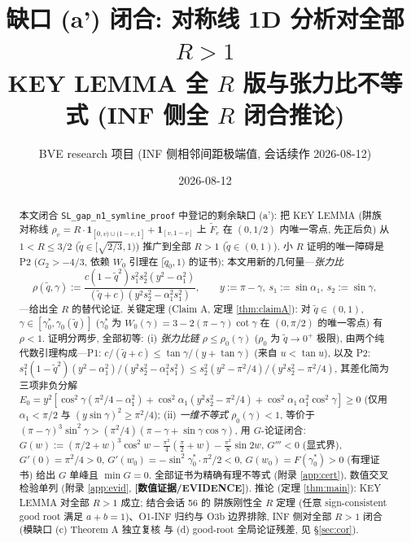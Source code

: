\documentclass[UTF8]{ctexart}
\title{\texorpdfstring{缺口 (a') 闭合: 对称线 1D 分析对全部 $R>1$\\
\large KEY LEMMA 全 $R$ 版与张力比不等式 (INF 侧全 $R$ 闭合推论)}
{缺口 (a') 闭合: 对称线 1D 分析对全部 R>1; KEY LEMMA 全 R 版与张力比不等式 (INF 侧全 R 闭合推论)}}
\author{BVE research 项目 (INF 侧相邻间距极端值, 会话续作 2026-08-12)}
\date{2026-08-12}
\newcommand{\EVID}{\textbf{[数值证据/EVIDENCE]}}
\begin{document}
\maketitle

\begin{abstract}
本文闭合 \texttt{SL\_gap\_n1\_symline\_proof} 中登记的剩余缺口 (a'): 把
KEY LEMMA (阱族对称线 $\rho_v=R\cdot\mathbf1_{[0,v)\cup(1-v,1]}+\mathbf1_{[v,1-v]}$
上 $\widetilde F_e$ 在 $(0,1/2)$ 内唯一零点, 先正后负) 从 $1<R\le3/2$
($\tilde q\in[\sqrt{2/3},1)$) 推广到全部 $R>1$ ($\tilde q\in(0,1)$). 小 $R$
证明的唯一障碍是 P2 ($G_2>-4/3$, 依赖 $W_0$ 引理在 $[\tilde q_0,1)$ 的证书);
本文用新的几何量---\emph{张力比}
\begin{equation*}
	\rho(\tilde q,\gamma):=\frac{c(1-\tilde q^2)s_1^2s_2^2(y^2-\alpha_1^2)}
	{(\tilde q+c)(y^2s_2^2-\alpha_1^2s_1^2)},\qquad
	y:=\pi-\gamma,\ s_1:=\sin\alpha_1,\ s_2:=\sin\gamma,
\end{equation*}
---给出全 $R$ 的替代论证. 关键定理 (Claim A, 定理 \ref{thm:claimA}): 对
$\tilde q\in(0,1)$, $\gamma\in[\gamma_0^*,\gamma_0(\tilde q)]$ ($\gamma_0^*$ 为
$W_0(\gamma)=3-2(\pi-\gamma)\cot\gamma$ 在 $(0,\pi/2)$ 的唯一零点) 有 $\rho<1$.
证明分两步, 全部初等: (i) \emph{张力比链} $\rho\le\rho_0(\gamma)$
($\rho_0$ 为 $\tilde q\to0^+$ 极限), 由两个纯代数引理构成---P1:
$c/(\tilde q+c)\le\tan\gamma/(y+\tan\gamma)$ (来自 $u<\tan u$), 以及 P2:
$s_1^2(1-\tilde q^2)(y^2-\alpha_1^2)/(y^2s_2^2-\alpha_1^2s_1^2)\le
s_2^2(y^2-\pi^2/4)/(y^2s_2^2-\pi^2/4)$, 其差化简为三项非负分解
$E_0=y^2[\cos^2\gamma(\pi^2/4-\alpha_1^2)+\cos^2\alpha_1(y^2s_2^2-\pi^2/4)
+\cos^2\alpha_1\,\alpha_1^2\cos^2\gamma]\ge0$ (仅用 $\alpha_1<\pi/2$ 与
$(y\sin\gamma)^2\ge\pi^2/4$); (ii) \emph{一维不等式} $\rho_0(\gamma)<1$, 等价于
$(\pi-\gamma)^3\sin^2\gamma>(\pi^2/4)(\pi-\gamma+\sin\gamma\cos\gamma)$, 用
$G$-论证闭合: $G(w):=(\pi/2+w)^3\cos^2w-\frac{\pi^2}{4}(\frac\pi2+w)
-\frac{\pi^2}{8}\sin2w$, $G'''<0$ (显式界), $G'(0)=\pi^2/4>0$,
$G'(w_0)=-\sin^2\gamma_0^*\cdot\pi^2/2<0$, $G(w_0)=F(\gamma_0^*)>0$
(有理证书) 给出 $G$ 单峰且 $\min G=0$. 全部证书为精确有理不等式
(附录 \ref{app:cert}), 数值交叉检验单列 (附录 \ref{app:evid}, \EVID{}).
推论 (定理 \ref{thm:main}): KEY LEMMA 对全部 $R>1$ 成立; 结合会话 56 的
阱族刚性全 $R$ 定理 (任意 sign-consistent good root 满足 $a+b=1$)、O1-INF
归约与 O3b 边界排除, INF 侧对全部 $R>1$ 闭合 (模缺口 (c) Theorem A 独立复核
与 (d) good-root 全局论证残差, 见 \S\ref{sec:cor}).
\end{abstract}

\tableofcontents
\end{document}
